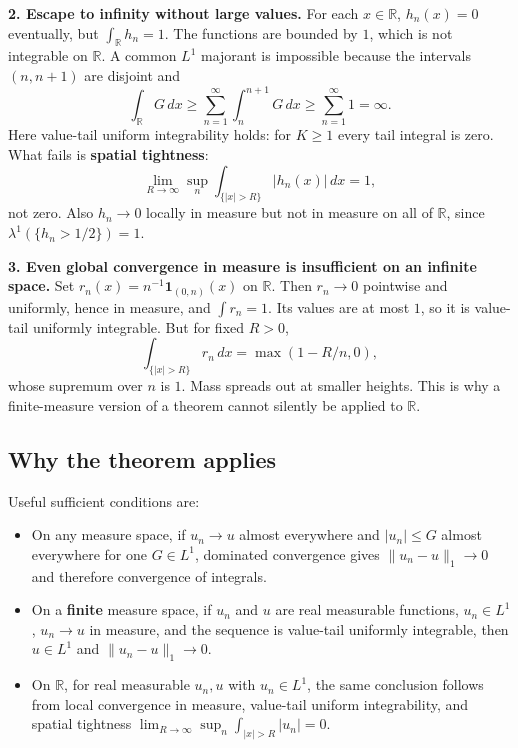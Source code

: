 \documentclass[
  11pt,
]{article}
\providecommand{\tightlist}{%
  \setlength{\itemsep}{0pt}\setlength{\parskip}{0pt}}
\begin{document}
\textbf{2. Escape to infinity without large values.} For each
\(x\in\mathbb R\), \(h_n(x)=0\) eventually, but
\(\int_{\mathbb R}h_n=1\). The functions are bounded by \(1\), which is
not integrable on \(\mathbb R\). A common \(L^1\) majorant is impossible
because the intervals \((n,n+1)\) are disjoint and \[
\int_{\mathbb R}G\,dx\ge\sum_{n=1}^{\infty}\int_n^{n+1}G\,dx\ge\sum_{n=1}^{\infty}1=\infty.
\] Here value-tail uniform integrability holds: for \(K\ge1\) every tail
integral is zero. What fails is \textbf{spatial tightness}: \[
\lim_{R\to\infty}\sup_n\int_{\{|x|>R\}}|h_n(x)|\,dx=1,
\] not zero. Also \(h_n\to0\) locally in measure but not in measure on
all of \(\mathbb R\), since \(\lambda^1(\{h_n>1/2\})=1\).

\textbf{3. Even global convergence in measure is insufficient on an
infinite space.} Set \(r_n(x)=n^{-1}\mathbf1_{(0,n)}(x)\) on
\(\mathbb R\). Then \(r_n\to0\) pointwise and uniformly, hence in
measure, and \(\int r_n=1\). Its values are at most \(1\), so it is
value-tail uniformly integrable. But for fixed \(R>0\), \[
\int_{\{|x|>R\}}r_n\,dx=\max(1-R/n,0),
\] whose supremum over \(n\) is \(1\). Mass spreads out at smaller
heights. This is why a finite-measure version of a theorem cannot
silently be applied to \(\mathbb R\).

\subsection{Why the theorem applies}\label{why-the-theorem-applies-13}

Useful sufficient conditions are:

\begin{itemize}
\tightlist
\item
  On any measure space, if \(u_n\to u\) almost everywhere and
  \(|u_n|\le G\) almost everywhere for one \(G\in L^1\), dominated
  convergence gives \(\|u_n-u\|_1\to0\) and therefore convergence of
  integrals.
\item
  On a \textbf{finite} measure space, if \(u_n\) and \(u\) are real
  measurable functions, \(u_n\in L^1\), \(u_n\to u\) in measure, and the
  sequence is value-tail uniformly integrable, then \(u\in L^1\) and
  \(\|u_n-u\|_1\to0\).
\item
  On \(\mathbb R\), for real measurable \(u_n,u\) with \(u_n\in L^1\),
  the same conclusion follows from local convergence in measure,
  value-tail uniform integrability, and spatial tightness
  \(\lim_{R\to\infty}\sup_n\int_{|x|>R}|u_n|=0\).
\end{itemize}
\end{document}
